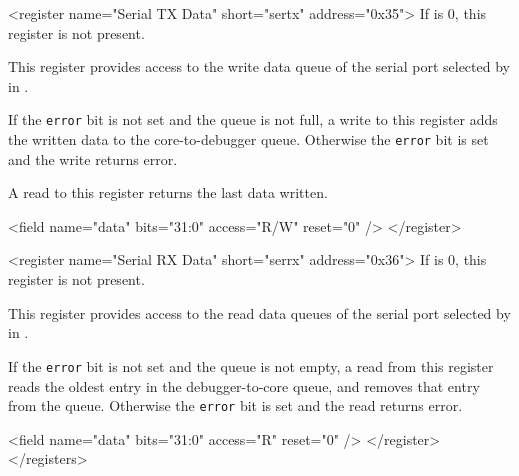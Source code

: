     <register name="Serial TX Data" short="sertx" address="0x35">
        If \Fserialcount is 0, this register is not present.

        This register provides access to the write data queue of the serial port
        selected by \Fserial in \Rsercs.

        If the {\tt error} bit is not set and the queue is not full, a write to this register
        adds the written data to the core-to-debugger queue.
        Otherwise the {\tt error} bit is set and the write returns error.

        A read to this register returns the last data written.

        <field name="data" bits="31:0" access="R/W" reset="0" />
    </register>

    <register name="Serial RX Data" short="serrx" address="0x36">
        If \Fserialcount is 0, this register is not present.

        This register provides access to the read data queues of the serial port
        selected by \Fserial in \Rsercs.

        If the {\tt error} bit is not set and the queue is not empty, a read from this register reads the
        oldest entry in the debugger-to-core queue, and removes that entry from the queue.
        Otherwise the {\tt error} bit is set and the read returns error.

        <field name="data" bits="31:0" access="R" reset="0" />
    </register>
</registers>
